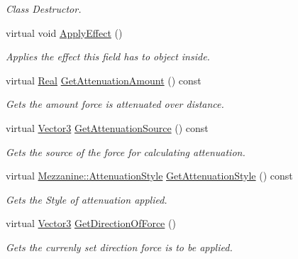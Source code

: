 \begin{DoxyCompactItemize}
\begin{DoxyCompactList}\small\item\em Class Destructor. \item\end{DoxyCompactList}\item 
virtual void \hyperlink{classMezzanine_1_1FieldOfForce_ae82e9a45515d40513ad1ac2e606c627b}{ApplyEffect} ()
\begin{DoxyCompactList}\small\item\em Applies the effect this field has to object inside. \item\end{DoxyCompactList}\item 
virtual \hyperlink{namespaceMezzanine_a726731b1a7df72bf3583e4a97282c6f6}{Real} \hyperlink{classMezzanine_1_1FieldOfForce_a0f5340224f7cec6e9086d49a3d51ae07}{GetAttenuationAmount} () const 
\begin{DoxyCompactList}\small\item\em Gets the amount force is attenuated over distance. \item\end{DoxyCompactList}\item 
virtual \hyperlink{classMezzanine_1_1Vector3}{Vector3} \hyperlink{classMezzanine_1_1FieldOfForce_a0f1232162d04d967907a55e8c9bc8661}{GetAttenuationSource} () const 
\begin{DoxyCompactList}\small\item\em Gets the source of the force for calculating attenuation. \item\end{DoxyCompactList}\item 
virtual \hyperlink{namespaceMezzanine_a2d10a79e11a2031df10af540eede12fa}{Mezzanine::AttenuationStyle} \hyperlink{classMezzanine_1_1FieldOfForce_a45f3ea5f8a48ff4a7dbe135d5003d267}{GetAttenuationStyle} () const 
\begin{DoxyCompactList}\small\item\em Gets the Style of attenuation applied. \item\end{DoxyCompactList}\item 
virtual \hyperlink{classMezzanine_1_1Vector3}{Vector3} \hyperlink{classMezzanine_1_1FieldOfForce_aa38710cbe67fad1b0be2e0a414d8e55c}{GetDirectionOfForce} ()
\begin{DoxyCompactList}\small\item\em Gets the currenly set direction force is to be applied. \item\end{DoxyCompactList}\item 

\end{DoxyCompactItemize}
